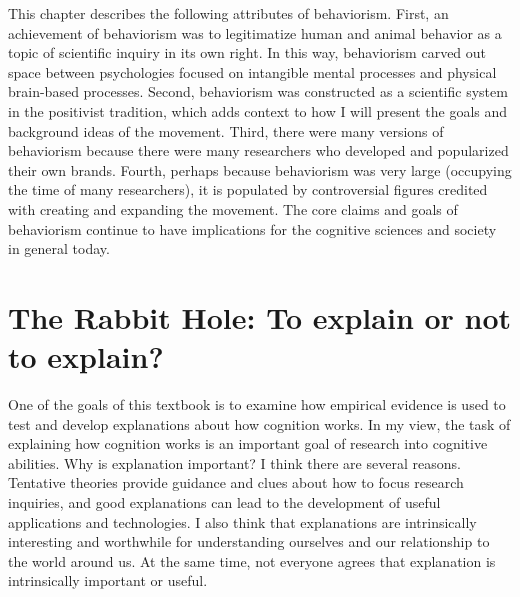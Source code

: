 \documentclass[
  oneside,
  12pt]{crumpbook}
\begin{document}
This chapter describes the following attributes of behaviorism. First, an achievement of behaviorism was to legitimatize human and animal behavior as a topic of scientific inquiry in its own right. In this way, behaviorism carved out space between psychologies focused on intangible mental processes and physical brain-based processes. Second, behaviorism was constructed as a scientific system in the positivist tradition, which adds context to how I will present the goals and background ideas of the movement. Third, there were many versions of behaviorism because there were many researchers who developed and popularized their own brands. Fourth, perhaps because behaviorism was very large (occupying the time of many researchers), it is populated by controversial figures credited with creating and expanding the movement. The core claims and goals of behaviorism continue to have implications for the cognitive sciences and society in general today.

\hypertarget{the-rabbit-hole-to-explain-or-not-to-explain}{%
\section{The Rabbit Hole: To explain or not to explain?}\label{the-rabbit-hole-to-explain-or-not-to-explain}}

One of the goals of this textbook is to examine how empirical evidence is used to test and develop explanations about how cognition works. In my view, the task of explaining how cognition works is an important goal of research into cognitive abilities. Why is explanation important? I think there are several reasons. Tentative theories provide guidance and clues about how to focus research inquiries, and good explanations can lead to the development of useful applications and technologies. I also think that explanations are intrinsically interesting and worthwhile for understanding ourselves and our relationship to the world around us. At the same time, not everyone agrees that explanation is intrinsically important or useful.
\end{document}
